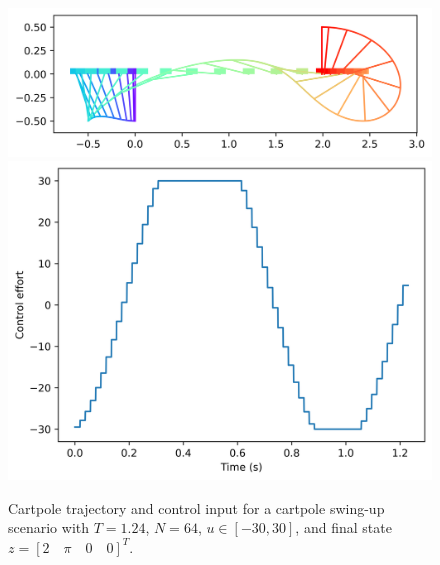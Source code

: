 \documentclass{exam}
\begin{document}
\begin{multicols}{2}
\begin{figure}[H]
    \centering
    \includegraphics[width=1.0\linewidth]{cartpole_swingy-1.24s.png}
    \includegraphics[width=1.0\linewidth]{control_inputty-1.24s.png}
    \caption{Cartpole trajectory and control input for a cartpole swing-up scenario with $T = 1.24$, $N = 64$, $u \in [-30, 30]$, and final state $z = [2 \quad \pi \quad 0 \quad 0]^T$.}
    \label{fig:shortest-time-trajectory}
\end{figure}


\end{multicols}
\end{document}
